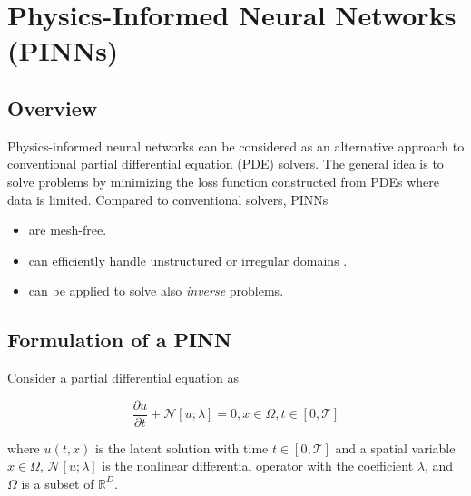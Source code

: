 \chapter{Physics-Informed Neural Networks (PINNs)}
\section{Overview}
\label{sec:pinns_overview}

Physics-informed neural networks can be considered as an alternative approach to conventional partial
differential equation (PDE) solvers. 
The general idea is to solve problems by minimizing the loss function constructed from PDEs where data
is limited. Compared to conventional solvers, PINNs

\begin{itemize}
    \item are mesh-free.
    \item can efficiently handle unstructured or irregular domains \cite{lu2021physics}.
    \item can be applied to solve also \textit{inverse} problems.
\end{itemize}

\section{Formulation of a PINN}
\label{sec:pinns_formulation}

\noindent Consider a partial differential equation as 

\begin{equation}
    \label{eq:governing}
    \frac{\partial u}{\partial t}+\mathcal{N}[u ; \lambda]=0, x \in \Omega, t \in [0,\mathcal{T}]
\end{equation}

\noindent where $u(t,x)$ is the latent solution with time $t \in [0,\mathcal{T}]$ and a spatial variable
$x \in \Omega$, $\mathcal{N}[u;\lambda]$ is the nonlinear differential operator
with the coefficient $\lambda$, and $\Omega$ is a subset of $\mathbb{R}^{D}$.


